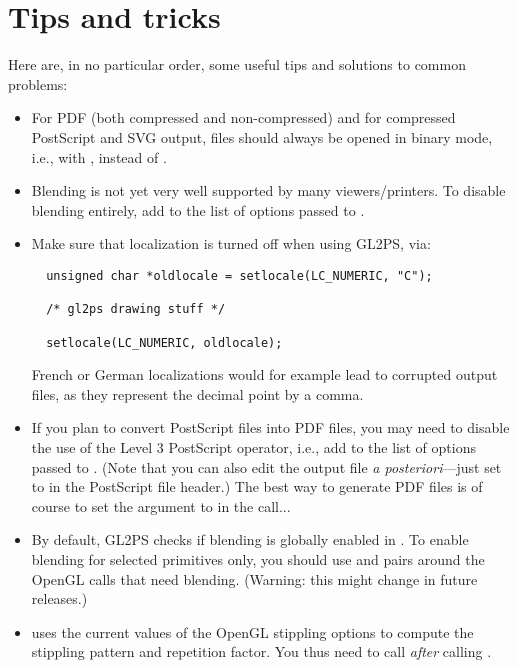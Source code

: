 \section{Tips and tricks}
\label{sec:tips}

Here are, in no particular order, some useful tips and solutions to common
problems:
\begin{itemize}
\item For PDF (both compressed and non-compressed) and for compressed
  PostScript and SVG output, files should always be opened in binary
  mode, i.e., with , instead of .
\item Blending is not yet very well supported by many viewers/printers. To
  disable blending entirely, add  to the list of
  options passed to .
\item Make sure that localization is turned off when using GL2PS, via:
\begin{verbatim}
  unsigned char *oldlocale = setlocale(LC_NUMERIC, "C");

  /* gl2ps drawing stuff */

  setlocale(LC_NUMERIC, oldlocale);
\end{verbatim}
  French or German localizations would for example lead to corrupted output
  files, as they represent the decimal point by a comma.
\item If you plan to convert PostScript files into PDF files, you may need
  to disable the use of the Level 3 PostScript  operator, i.e.,
  add  to the list of options passed to
  . (Note that you can also edit the output file \emph{a
    posteriori}---just set  to  in the
  PostScript file header.) The best way to generate PDF files is of course
  to set the  argument to  in the
   call...
\item By default, GL2PS checks if blending is globally enabled in
  . To enable blending for selected primitives
  only, you should use  and
   pairs around the OpenGL calls that
  need blending. (Warning: this might change in future releases.)
\item {} uses the current values of
  the OpenGL stippling options to compute the stippling pattern and
  repetition factor. You thus need to call
   \emph{after} calling
  .
 \end{itemize}


